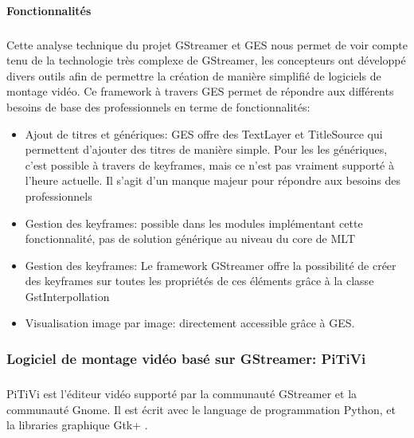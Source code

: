 \paragraph{Fonctionnalités}

\subparagraph{ }

Cette analyse technique du projet GStreamer et GES nous permet de voir
compte tenu de la technologie très complexe de GStreamer, les concepteurs
ont développé divers outils afin de permettre la création de manière
simplifié de logiciels de montage vidéo. Ce framework à travers GES
permet de répondre aux différents besoins de base des professionnels
en terme de fonctionnalités:

\begin{itemize}

  \item {Ajout de titres et génériques: GES offre des TextLayer
  et TitleSource qui permettent d'ajouter des titres de manière
  simple. Pour les
    les génériques, c'est possible à travers de keyframes, mais ce
    n'est pas vraiment supporté à l'heure actuelle. Il s'agit d'un
    manque majeur pour répondre aux besoins des professionnels}

  \item {Gestion des keyframes: possible dans les modules implémentant
    cette fonctionnalité, pas de solution générique au niveau du core
    de MLT}

  \item {Gestion des keyframes: Le framework GStreamer offre la
  possibilité
    de créer des keyframes sur toutes les propriétés de ces éléments
    grâce à la classe GstInterpollation}

  \item {Visualisation image par image: directement accessible grâce
  à GES.}

\end{itemize}

\subsubsection {Logiciel de montage vidéo basé sur GStreamer: PiTiVi}

\subparagraph{}

PiTiVi est l'éditeur vidéo supporté par la communauté GStreamer et la
communauté Gnome. Il est écrit avec le language de programmation Python,
et la libraries graphique Gtk+ .

